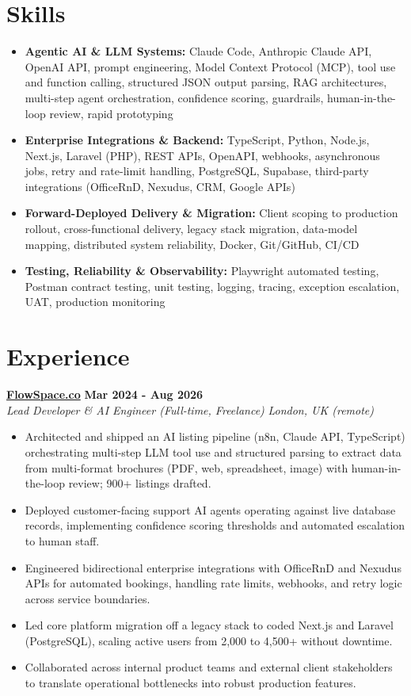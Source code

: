 \documentclass[a4paper,10pt]{article}
\newcommand{\role}[4]{%
  \textbf{#1} \hfill \textbf{#2}\\[1pt]%
  \textit{#3} \hfill \textit{#4}\\[2pt]%
}
\begin{document}
\section{Skills}
\begin{itemize}
  \item \textbf{Agentic AI \& LLM Systems:} Claude Code, Anthropic Claude API, OpenAI API, prompt engineering, Model Context Protocol (MCP), tool use and function calling, structured JSON output parsing, RAG architectures, multi-step agent orchestration, confidence scoring, guardrails, human-in-the-loop review, rapid prototyping
  \item \textbf{Enterprise Integrations \& Backend:} TypeScript, Python, Node.js, Next.js, Laravel (PHP), REST APIs, OpenAPI, webhooks, asynchronous jobs, retry and rate-limit handling, PostgreSQL, Supabase, third-party integrations (OfficeRnD, Nexudus, CRM, Google APIs)
  \item \textbf{Forward-Deployed Delivery \& Migration:} Client scoping to production rollout, cross-functional delivery, legacy stack migration, data-model mapping, distributed system reliability, Docker, Git/GitHub, CI/CD
  \item \textbf{Testing, Reliability \& Observability:} Playwright automated testing, Postman contract testing, unit testing, logging, tracing, exception escalation, UAT, production monitoring
\end{itemize}

\section{Experience}

\role{\href{https://flowspace.co}{FlowSpace.co}}{Mar 2024 - Aug 2026}{Lead Developer \& AI Engineer (Full-time, Freelance)}{London, UK (remote)}
\begin{itemize}
  \item Architected and shipped an AI listing pipeline (n8n, Claude API, TypeScript) orchestrating multi-step LLM tool use and structured parsing to extract data from multi-format brochures (PDF, web, spreadsheet, image) with human-in-the-loop review; 900+ listings drafted.
  \item Deployed customer-facing support AI agents operating against live database records, implementing confidence scoring thresholds and automated escalation to human staff.
  \item Engineered bidirectional enterprise integrations with OfficeRnD and Nexudus APIs for automated bookings, handling rate limits, webhooks, and retry logic across service boundaries.
  \item Led core platform migration off a legacy stack to coded Next.js and Laravel (PostgreSQL), scaling active users from 2,000 to 4,500+ without downtime.
  \item Collaborated across internal product teams and external client stakeholders to translate operational bottlenecks into robust production features.
\end{itemize}
\end{document}
